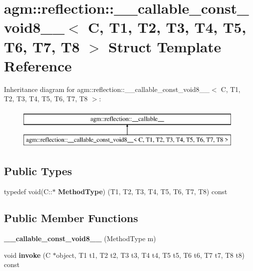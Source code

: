 \hypertarget{structagm_1_1reflection_1_1____callable__const__void8____}{}\section{agm\+:\+:reflection\+:\+:\+\_\+\+\_\+callable\+\_\+const\+\_\+void8\+\_\+\+\_\+$<$ C, T1, T2, T3, T4, T5, T6, T7, T8 $>$ Struct Template Reference}
\label{structagm_1_1reflection_1_1____callable__const__void8____}
Inheritance diagram for agm\+:\+:reflection\+:\+:\+\_\+\+\_\+callable\+\_\+const\+\_\+void8\+\_\+\+\_\+$<$ C, T1, T2, T3, T4, T5, T6, T7, T8 $>$\+:\begin{figure}[H]
\begin{center}
\leavevmode
\includegraphics[height=2.000000cm]{structagm_1_1reflection_1_1____callable__const__void8____}
\end{center}
\end{figure}
\subsection*{Public Types}
\begin{DoxyCompactItemize}
\item 
typedef void(C\+::$\ast$ {\bfseries Method\+Type}) (T1, T2, T3, T4, T5, T6, T7, T8) const \hypertarget{structagm_1_1reflection_1_1____callable__const__void8_____ac28031759a47396d990c1ddffcdf0e14}{}\label{structagm_1_1reflection_1_1____callable__const__void8_____ac28031759a47396d990c1ddffcdf0e14}

\end{DoxyCompactItemize}
\subsection*{Public Member Functions}
\begin{DoxyCompactItemize}
\item 
{\bfseries \+\_\+\+\_\+callable\+\_\+const\+\_\+void8\+\_\+\+\_\+} (Method\+Type m)\hypertarget{structagm_1_1reflection_1_1____callable__const__void8_____a37cc9e138e0c19c66422ddf9bf45ec83}{}\label{structagm_1_1reflection_1_1____callable__const__void8_____a37cc9e138e0c19c66422ddf9bf45ec83}

\item 
void {\bfseries invoke} (C $\ast$object, T1 t1, T2 t2, T3 t3, T4 t4, T5 t5, T6 t6, T7 t7, T8 t8) const \hypertarget{structagm_1_1reflection_1_1____callable__const__void8_____ae0d1ab9af841383628cefcf3f964d273}{}\label{structagm_1_1reflection_1_1____callable__const__void8_____ae0d1ab9af841383628cefcf3f964d273}

\end{DoxyCompactItemize}
